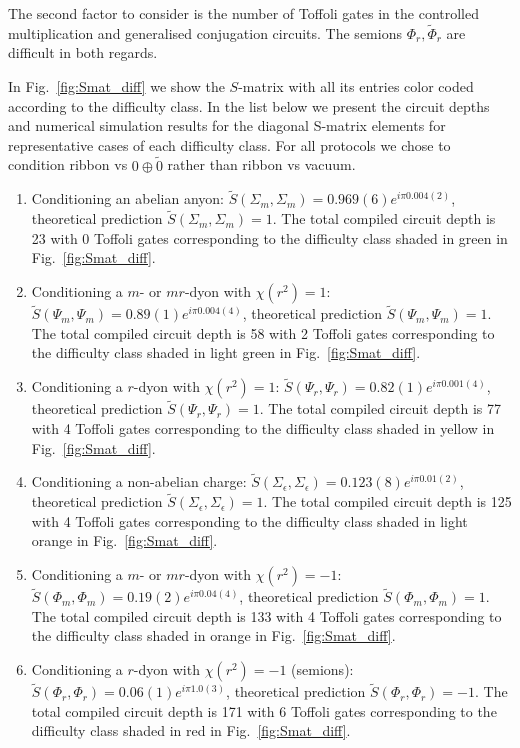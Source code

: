 \documentclass[two column]{article}
\begin{document}
The second factor to consider is the number of Toffoli gates in the controlled multiplication and generalised conjugation circuits. The semions $\Phi_r,\tilde \Phi_r$ are difficult in both regards. 

In Fig.~\ref{fig:Smat_diff} we show the $S$-matrix with all its entries color coded according to the difficulty class. In the list below we present the circuit depths and numerical simulation results for the diagonal S-matrix elements for representative cases of each difficulty class. For all protocols we chose to condition ribbon vs $0\oplus \tilde 0$ rather than ribbon vs vacuum.

\begin{enumerate}
	\item Conditioning an abelian anyon: $\tilde{S}(\Sigma_m, \Sigma_m) = 0.969(6)e^{i\pi 0.004(2)}$, theoretical prediction $\tilde{S}(\Sigma_m, \Sigma_m)=1$. The total compiled circuit depth is 23 with 0 Toffoli gates corresponding to the difficulty class shaded in green in Fig.~\ref{fig:Smat_diff}.
	\item Conditioning a $m$- or $mr$-dyon with $\chi(r^2) = 1$: $\tilde{S}(\Psi_m, \Psi_m) = 0.89(1)e^{i\pi 0.004(4)}$, theoretical prediction $\tilde{S}(\Psi_m, \Psi_m)=1$. The total compiled circuit depth is 58 with 2 Toffoli gates corresponding to the difficulty class shaded in light green in Fig.~\ref{fig:Smat_diff}.
	\item Conditioning a $r$-dyon with $\chi(r^2) = 1$: $\tilde{S}(\Psi_r, \Psi_r) = 0.82(1)e^{i\pi 0.001(4)}$, theoretical prediction $\tilde{S}(\Psi_r, \Psi_r)=1$. The total compiled circuit depth is 77 with 4 Toffoli gates corresponding to the difficulty class shaded in yellow in Fig.~\ref{fig:Smat_diff}.
	\item Conditioning a non-abelian charge: $\tilde{S}(\Sigma_\epsilon, \Sigma_\epsilon) = 0.123(8)e^{i\pi 0.01(2)}$, theoretical prediction $\tilde{S}(\Sigma_\epsilon, \Sigma_\epsilon)=1$. The total compiled circuit depth is 125 with 4 Toffoli gates corresponding to the difficulty class shaded in light orange in Fig.~\ref{fig:Smat_diff}.
	\item Conditioning a $m$- or $mr$-dyon with $\chi(r^2) = -1$: $\tilde{S}(\Phi_m, \Phi_m) = 0.19(2)e^{i\pi 0.04(4)}$, theoretical prediction $\tilde{S}(\Phi_m, \Phi_m)=1$. The total compiled circuit depth is 133 with 4 Toffoli gates corresponding to the difficulty class shaded in orange in Fig.~\ref{fig:Smat_diff}.
	\item Conditioning a $r$-dyon with $\chi(r^2) = -1$ (semions): $\tilde{S}(\Phi_r, \Phi_r) = 0.06(1)e^{i\pi 1.0(3)}$, theoretical prediction $\tilde{S}(\Phi_r, \Phi_r)=-1$. The total compiled circuit depth is 171 with 6 Toffoli gates corresponding to the difficulty class shaded in red in Fig.~\ref{fig:Smat_diff}.
\end{enumerate}
\end{document}
